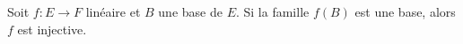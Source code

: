 Soit $f : E \to F$ linéaire et $B$  une base de $E$. Si la famille $f(B)$ est une base, alors $f$ est injective.

\begin{reponses}
\end{reponses}

